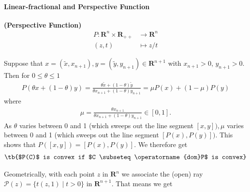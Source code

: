 \documentclass{article}
\newcommand{\bfs}[1]{\textbf{({#1}) }}
\newcommand{\dom}{\operatorname{dom}}
\begin{document}
\paragraph{Linear-fractional and Perspective Function} 

\begin{defa}{\bfs{Perspective Function}}
 \begin{align*}
    P: \mathbf{R}^{n} \times \mathbf{R}_{++} &\rightarrow \mathbf{R}^{n}\\ 
        (z, t)&\mapsto z / t
\end{align*}
\end{defa}

Suppose that $x=\left(\tilde{x}, x_{n+1}\right), y=\left(\tilde{y}, y_{n+1}\right) \in \mathbf{R}^{n+1}$ with $x_{n+1}>0$, $y_{n+1}>0 .$ Then for $0 \leq \theta \leq 1$
\begin{align*}
P(\theta x+(1-\theta) y)=\frac{\theta \tilde{x}+(1-\theta) \tilde{y}}{\theta x_{n+1}+(1-\theta) y_{n+1}}=\mu P(x)+(1-\mu) P(y)
\end{align*}
where
\begin{align*}
\mu=\frac{\theta x_{n+1}}{\theta x_{n+1}+(1-\theta) y_{n+1}} \in[0,1] .
\end{align*}
As $\theta$ varies between 0 and 1 (which sweeps out the line segment $[x, y]), \mu$ varies between 0 and 1 (which sweeps out the line segment $[P(x), P(y)])$. This shows that $P([x, y])=[P(x), P(y)]$. We therefore get 
\begin{align}
   \text{\tb{$P(C)$ is convex if $C \subseteq \dom  P$ is convex}} \label{eq:ps}
\end{align}

\begin{rema}
  Geometrically, with each point $z$ in $\mathbf{R}^{n}$ we associate the (open) ray $\mathcal{P}(z)=\{t(z, 1) \mid t>0\}$ in $\mathbf{R}^{n+1} .$ That means we get 
  
\end{rema}

\end{document}
